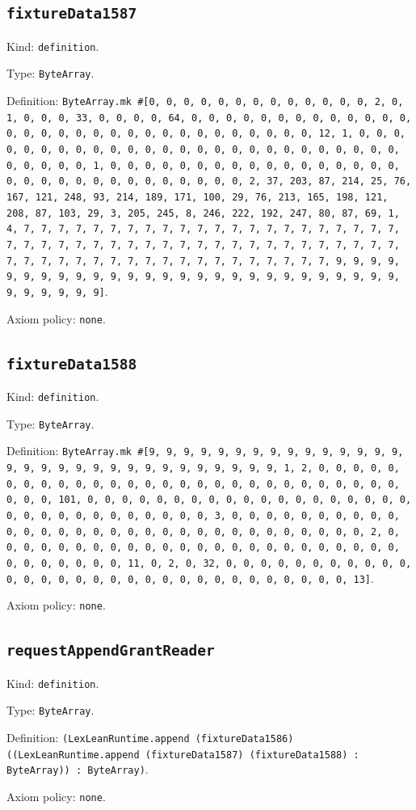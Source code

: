 \documentclass[11pt]{article}
\begin{document}
\subsection*{\texttt{fixtureData1587}}
\noindent Kind: \texttt{definition}.\par
\noindent Type: \texttt{ByteArray}.\par
\noindent Definition: \texttt{ByteArray.mk \#[0, 0, 0, 0, 0, 0, 0, 0, 0, 0, 0, 0, 0, 2, 0, 1, 0, 0, 0, 33, 0, 0, 0, 0, 64, 0, 0, 0, 0, 0, 0, 0, 0, 0, 0, 0, 0, 0, 0, 0, 0, 0, 0, 0, 0, 0, 0, 0, 0, 0, 0, 0, 0, 0, 0, 0, 12, 1, 0, 0, 0, 0, 0, 0, 0, 0, 0, 0, 0, 0, 0, 0, 0, 0, 0, 0, 0, 0, 0, 0, 0, 0, 0, 0, 0, 0, 0, 0, 0, 1, 0, 0, 0, 0, 0, 0, 0, 0, 0, 0, 0, 0, 0, 0, 0, 0, 0, 0, 0, 0, 0, 0, 0, 0, 0, 0, 0, 0, 0, 0, 0, 2, 37, 203, 87, 214, 25, 76, 167, 121, 248, 93, 214, 189, 171, 100, 29, 76, 213, 165, 198, 121, 208, 87, 103, 29, 3, 205, 245, 8, 246, 222, 192, 247, 80, 87, 69, 1, 4, 7, 7, 7, 7, 7, 7, 7, 7, 7, 7, 7, 7, 7, 7, 7, 7, 7, 7, 7, 7, 7, 7, 7, 7, 7, 7, 7, 7, 7, 7, 7, 7, 7, 7, 7, 7, 7, 7, 7, 7, 7, 7, 7, 7, 7, 7, 7, 7, 7, 7, 7, 7, 7, 7, 7, 7, 7, 7, 7, 7, 7, 7, 7, 7, 9, 9, 9, 9, 9, 9, 9, 9, 9, 9, 9, 9, 9, 9, 9, 9, 9, 9, 9, 9, 9, 9, 9, 9, 9, 9, 9, 9, 9, 9, 9, 9, 9]}.\par
\noindent Axiom policy: \texttt{none}.\par
\subsection*{\texttt{fixtureData1588}}
\noindent Kind: \texttt{definition}.\par
\noindent Type: \texttt{ByteArray}.\par
\noindent Definition: \texttt{ByteArray.mk \#[9, 9, 9, 9, 9, 9, 9, 9, 9, 9, 9, 9, 9, 9, 9, 9, 9, 9, 9, 9, 9, 9, 9, 9, 9, 9, 9, 9, 9, 9, 9, 1, 2, 0, 0, 0, 0, 0, 0, 0, 0, 0, 0, 0, 0, 0, 0, 0, 0, 0, 0, 0, 0, 0, 0, 0, 0, 0, 0, 0, 0, 0, 0, 0, 101, 0, 0, 0, 0, 0, 0, 0, 0, 0, 0, 0, 0, 0, 0, 0, 0, 0, 0, 0, 0, 0, 0, 0, 0, 0, 0, 0, 0, 0, 0, 0, 3, 0, 0, 0, 0, 0, 0, 0, 0, 0, 0, 0, 0, 0, 0, 0, 0, 0, 0, 0, 0, 0, 0, 0, 0, 0, 0, 0, 0, 0, 0, 0, 2, 0, 0, 0, 0, 0, 0, 0, 0, 0, 0, 0, 0, 0, 0, 0, 0, 0, 0, 0, 0, 0, 0, 0, 0, 0, 0, 0, 0, 0, 0, 0, 11, 0, 2, 0, 32, 0, 0, 0, 0, 0, 0, 0, 0, 0, 0, 0, 0, 0, 0, 0, 0, 0, 0, 0, 0, 0, 0, 0, 0, 0, 0, 0, 0, 0, 0, 0, 13]}.\par
\noindent Axiom policy: \texttt{none}.\par
\subsection*{\texttt{requestAppendGrantReader}}
\noindent Kind: \texttt{definition}.\par
\noindent Type: \texttt{ByteArray}.\par
\noindent Definition: \texttt{(LexLeanRuntime.append (fixtureData1586) ((LexLeanRuntime.append (fixtureData1587) (fixtureData1588) : ByteArray)) : ByteArray)}.\par
\noindent Axiom policy: \texttt{none}.\par
\end{document}
